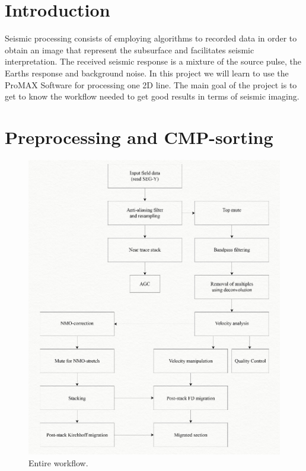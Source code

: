 \documentclass[10pt,a4paper]{article}
\begin{document}
\newpage

\tableofcontents

\newpage

\section{Introduction}

Seismic processing consists of employing algorithms to recorded data in order to obtain an image that represent the subsurface and facilitates seismic interpretation. The received seismic response is a mixture of the source pulse, the Earths response and background noise. In this project we will learn to use the ProMAX Software for processing one 2D line. The main goal of the project is to get to know the workflow needed to get good results in terms of seismic imaging.


\section{Preprocessing and CMP-sorting}

\begin{figure}[H]
\includegraphics[scale=0.4]{wf3.jpg}
\caption{Entire workflow.}
\label{wf}
\end{figure}
\end{document}

